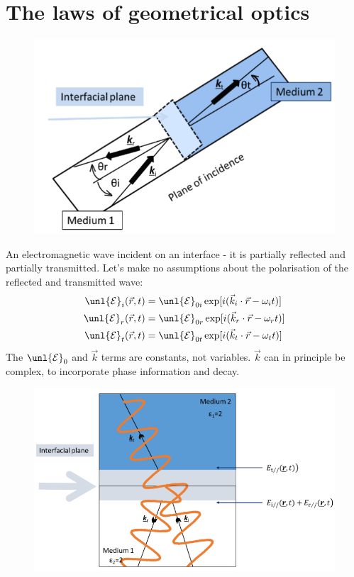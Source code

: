 \documentclass[a4paper, 11pt, normalem]{report}
\newcommand\E{\mathcal{E}}
\newcommand\uE{\unl{\E}}
\newcommand\vr{\vec{r}}
\newcommand\om{\omega}
\begin{document}
\section{The laws of geometrical optics}

\begin{figure}[H]
	\centering
	\includegraphics[scale=0.4]{geolaw.png}
\end{figure}

An electromagnetic wave incident on an interface - it is partially reflected and partially transmitted.
Let's make no assumptions about the polarisation of the reflected and transmitted wave:
\begin{align}
	\uE_i(\vr,t) &= \uE_{0i}\exp[i(\vec{k}_i\cdot\vr - \om_it)] \\
	\uE_r(\vr,t) &= \uE_{0r}\exp[i(\vec{k}_r\cdot\vr - \om_rt)] \\
	\uE_t(\vr,t) &= \uE_{0t}\exp[i(\vec{k}_t\cdot\vr - \om_tt)]
\end{align}
The $\uE_0$ and $\vec{k}$ terms are constants, not variables.
$\vec{k}$ can in principle be complex, to incorporate phase information and decay.

\begin{figure}[H]
	\centering
	\includegraphics[scale=0.4]{geolaw2.png}
\end{figure}
\end{document}
